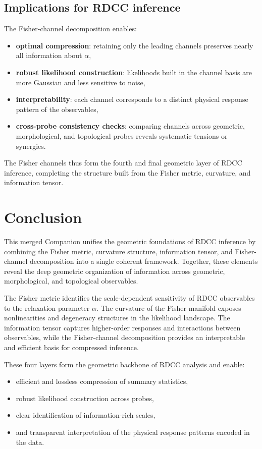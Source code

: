 \documentclass[11pt,a4paper]{article}
\begin{document}
\subsection{Implications for RDCC inference}

The Fisher-channel decomposition enables:
\begin{itemize}
    \item \textbf{optimal compression}: retaining only the leading channels 
    preserves nearly all information about $\alpha$,

    \item \textbf{robust likelihood construction}: likelihoods built in the 
    channel basis are more Gaussian and less sensitive to noise,

    \item \textbf{interpretability}: each channel corresponds to a distinct 
    physical response pattern of the observables,

    \item \textbf{cross-probe consistency checks}: comparing channels across 
    geometric, morphological, and topological probes reveals systematic 
    tensions or synergies.
\end{itemize}

The Fisher channels thus form the fourth and final geometric layer of RDCC 
inference, completing the structure built from the Fisher metric, curvature, 
and information tensor.
\section{Conclusion}

This merged Companion unifies the geometric foundations of RDCC inference by 
combining the Fisher metric, curvature structure, information tensor, and 
Fisher-channel decomposition into a single coherent framework. Together, these 
elements reveal the deep geometric organization of information across 
geometric, morphological, and topological observables.

The Fisher metric identifies the scale-dependent sensitivity of RDCC 
observables to the relaxation parameter $\alpha$. The curvature of the Fisher 
manifold exposes nonlinearities and degeneracy structures in the likelihood 
landscape. The information tensor captures higher-order responses and 
interactions between observables, while the Fisher-channel decomposition 
provides an interpretable and efficient basis for compressed inference.

These four layers form the geometric backbone of RDCC analysis and enable:
\begin{itemize}
    \item efficient and lossless compression of summary statistics,
    \item robust likelihood construction across probes,
    \item clear identification of information-rich scales,
    \item and transparent interpretation of the physical response patterns 
    encoded in the data.
\end{itemize}
\end{document}

